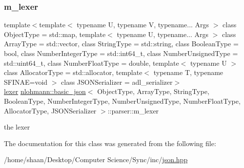 \subsubsection{\texorpdfstring{m\+\_\+lexer}{m\_lexer}}
{\footnotesize\ttfamily template$<$template$<$ typename U, typename V, typename... Args $>$ class Object\+Type = std\+::map, template$<$ typename U, typename... Args $>$ class Array\+Type = std\+::vector, class String\+Type  = std\+::string, class Boolean\+Type  = bool, class Number\+Integer\+Type  = std\+::int64\+\_\+t, class Number\+Unsigned\+Type  = std\+::uint64\+\_\+t, class Number\+Float\+Type  = double, template$<$ typename U $>$ class Allocator\+Type = std\+::allocator, template$<$ typename T, typename S\+F\+I\+N\+A\+E=void $>$ class J\+S\+O\+N\+Serializer = adl\+\_\+serializer$>$ \\
\hyperlink{classnlohmann_1_1basic__json_1_1lexer}{lexer} \hyperlink{classnlohmann_1_1basic__json}{nlohmann\+::basic\+\_\+json}$<$ Object\+Type, Array\+Type, String\+Type, Boolean\+Type, Number\+Integer\+Type, Number\+Unsigned\+Type, Number\+Float\+Type, Allocator\+Type, J\+S\+O\+N\+Serializer $>$\+::parser\+::m\+\_\+lexer\hspace{0.3cm}{\ttfamily [private]}}



the lexer 



The documentation for this class was generated from the following file\+:\begin{DoxyCompactItemize}
\item 
/home/shaan/\+Desktop/\+Computer Science/\+Sync/inc/\hyperlink{json_8hpp}{json.\+hpp}\end{DoxyCompactItemize}
